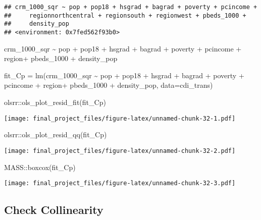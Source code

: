 \documentclass[
]{article}
\newenvironment{Shaded}{\begin{snugshade}}{\end{snugshade}}
\newcommand{\AttributeTok}[1]{\textcolor[rgb]{0.77,0.63,0.00}{#1}}
\newcommand{\FunctionTok}[1]{\textcolor[rgb]{0.00,0.00,0.00}{#1}}
\newcommand{\NormalTok}[1]{#1}
\newcommand{\OtherTok}[1]{\textcolor[rgb]{0.56,0.35,0.01}{#1}}
\newcommand{\SpecialCharTok}[1]{\textcolor[rgb]{0.00,0.00,0.00}{#1}}
\begin{document}
\begin{verbatim}
## crm_1000_sqr ~ pop + pop18 + hsgrad + bagrad + poverty + pcincome + 
##     regionnorthcentral + regionsouth + regionwest + pbeds_1000 + 
##     density_pop
## <environment: 0x7fed562f93b0>
\end{verbatim}

crm\_1000\_sqr \textasciitilde{} pop + pop18 + hsgrad + bagrad + poverty
+ pcincome + region+ pbeds\_1000 + density\_pop

\begin{Shaded}
\begin{Highlighting}[]
\NormalTok{fit\_Cp }\OtherTok{=} \FunctionTok{lm}\NormalTok{(crm\_1000\_sqr }\SpecialCharTok{\textasciitilde{}}\NormalTok{ pop }\SpecialCharTok{+}\NormalTok{ pop18 }\SpecialCharTok{+}\NormalTok{ hsgrad }\SpecialCharTok{+}\NormalTok{ bagrad }\SpecialCharTok{+}\NormalTok{ poverty }\SpecialCharTok{+}\NormalTok{ pcincome }\SpecialCharTok{+}\NormalTok{ region}\SpecialCharTok{+}\NormalTok{ pbeds\_1000 }\SpecialCharTok{+}\NormalTok{ density\_pop, }\AttributeTok{data=}\NormalTok{cdi\_trans)}

\NormalTok{olsrr}\SpecialCharTok{::}\FunctionTok{ols\_plot\_resid\_fit}\NormalTok{(fit\_Cp)}
\end{Highlighting}
\end{Shaded}

\texttt{[image: final\_project\_files/figure-latex/unnamed-chunk-32-1.pdf]}

\begin{Shaded}
\begin{Highlighting}[]
\NormalTok{olsrr}\SpecialCharTok{::}\FunctionTok{ols\_plot\_resid\_qq}\NormalTok{(fit\_Cp)}
\end{Highlighting}
\end{Shaded}

\texttt{[image: final\_project\_files/figure-latex/unnamed-chunk-32-2.pdf]}

\begin{Shaded}
\begin{Highlighting}[]
\NormalTok{MASS}\SpecialCharTok{::}\FunctionTok{boxcox}\NormalTok{(fit\_Cp)}
\end{Highlighting}
\end{Shaded}

\texttt{[image: final\_project\_files/figure-latex/unnamed-chunk-32-3.pdf]}

\hypertarget{check-collinearity}{%
\subsection{Check Collinearity}\label{check-collinearity}}
\end{document}
